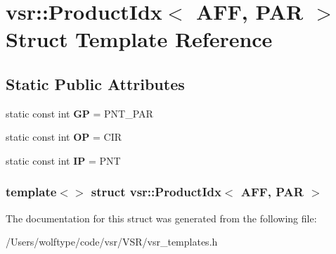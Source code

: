 \hypertarget{structvsr_1_1_product_idx_3_01_a_f_f_00_01_p_a_r_01_4}{\section{vsr\-:\-:Product\-Idx$<$ A\-F\-F, P\-A\-R $>$ Struct Template Reference}
\label{structvsr_1_1_product_idx_3_01_a_f_f_00_01_p_a_r_01_4}
}
\subsection*{Static Public Attributes}
\begin{DoxyCompactItemize}
\item 
\hypertarget{structvsr_1_1_product_idx_3_01_a_f_f_00_01_p_a_r_01_4_ac0a51f9f258bcc2125df414c2f1cc9a3}{static const int {\bfseries G\-P} = P\-N\-T\-\_\-\-P\-A\-R}\label{structvsr_1_1_product_idx_3_01_a_f_f_00_01_p_a_r_01_4_ac0a51f9f258bcc2125df414c2f1cc9a3}

\item 
\hypertarget{structvsr_1_1_product_idx_3_01_a_f_f_00_01_p_a_r_01_4_a8e5630a6460b90ba92ece6acf15a1b8e}{static const int {\bfseries O\-P} = C\-I\-R}\label{structvsr_1_1_product_idx_3_01_a_f_f_00_01_p_a_r_01_4_a8e5630a6460b90ba92ece6acf15a1b8e}

\item 
\hypertarget{structvsr_1_1_product_idx_3_01_a_f_f_00_01_p_a_r_01_4_a0de63ba1d76d014048127ec00e0af162}{static const int {\bfseries I\-P} = P\-N\-T}\label{structvsr_1_1_product_idx_3_01_a_f_f_00_01_p_a_r_01_4_a0de63ba1d76d014048127ec00e0af162}

\end{DoxyCompactItemize}
\subsubsection*{template$<$$>$ struct vsr\-::\-Product\-Idx$<$ A\-F\-F, P\-A\-R $>$}



The documentation for this struct was generated from the following file\-:\begin{DoxyCompactItemize}
\item 
/\-Users/wolftype/code/vsr/\-V\-S\-R/vsr\-\_\-templates.\-h\end{DoxyCompactItemize}
